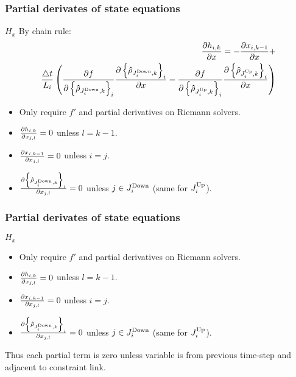 \begin{frame}[t]\frametitle{Partial derivates of state equations}

\begin{block}{$H_x$}
By chain rule:
\begin{align*}
\frac{\partial h_{i,k}}{\partial x}=-\frac{\partial x_{i,k-1}}{\partial x}+\\
\frac{\triangle t}{L_{i}}\left(\frac{\partial f}{\partial\left\{ \mathbf{\hat{\rho}}_{J_{i}^{\text{Down}},k}\right\} _{i}}\frac{\partial\left\{ \mathbf{\hat{\rho}}_{J_{i}^{\text{Down}},k}\right\} _{i}}{\partial x}-\frac{\partial f}{\partial\left\{ \mathbf{\hat{\rho}}_{J_{i}^{\text{Up}},k}\right\} _{i}}\frac{\partial\left\{ \mathbf{\hat{\rho}}_{J_{i}^{\text{Up}},k}\right\} _{i}}{\partial x}\right)    
\end{align*}

\begin{itemize}
    \item Only require $f'$ and partial derivatives on Riemann solvers.
    \item $\frac{\partial h_{i,k}}{\partial x_{j,l}} = 0$ unless $l = k - 1$.
    \item $\frac{\partial x_{i,k-1}}{\partial x_{j,l}} = 0$ unless $i = j$.
    \item $\frac{\partial\left\{ \mathbf{\hat{\rho}}_{J_{i}^{\text{Down}},k}\right\}_{i}}{\partial x_{j,l}} = 0$ unless $j \in J_{i}^{\text{Down}}$ (same for $J_{i}^{\text{Up}}$).
\end{itemize}
\end{block}
\end{frame}

\begin{frame}[t]\frametitle{Partial derivates of state equations}

\begin{block}{$H_x$}
\begin{itemize}
    \item Only require $f'$ and partial derivatives on Riemann solvers.
    \item $\frac{\partial h_{i,k}}{\partial x_{j,l}} = 0$ unless $l = k - 1$.
    \item $\frac{\partial x_{i,k-1}}{\partial x_{j,l}} = 0$ unless $i = j$.
    \item $\frac{\partial\left\{ \mathbf{\hat{\rho}}_{J_{i}^{\text{Down}},k}\right\}_{i}}{\partial x_{j,l}} = 0$ unless $j \in J_{i}^{\text{Down}}$ (same for $J_{i}^{\text{Up}}$).
\end{itemize}
Thus each partial term is zero unless variable is from previous time-step and adjacent to constraint link.
\end{block}
\end{frame}

